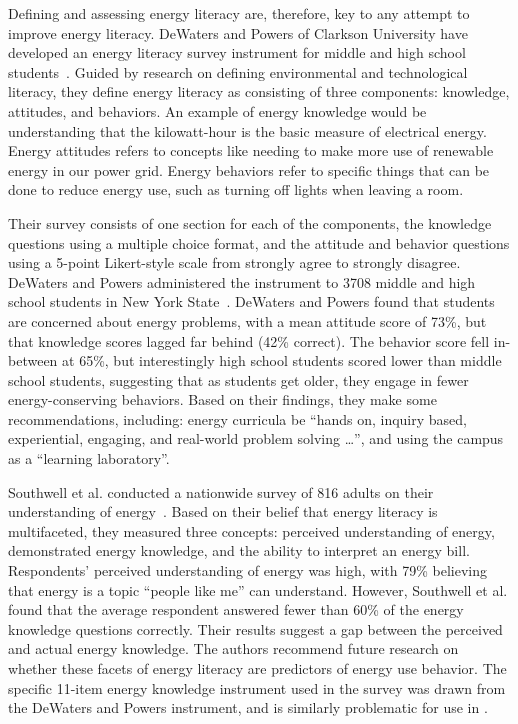 Defining and assessing energy literacy are, therefore, key to any attempt to improve energy literacy. DeWaters and Powers of Clarkson University have developed an energy literacy survey instrument for middle and high school students~\cite{DeWaters2007,DeWaters2008}. Guided by research on defining environmental and technological literacy, they define energy literacy as consisting of three components: knowledge, attitudes, and behaviors. An example of energy knowledge would be understanding that the kilowatt-hour is the basic measure of electrical energy. Energy attitudes refers to concepts like needing to make more use of renewable energy in our power grid. Energy behaviors refer to specific things that can be done to reduce energy use, such as turning off lights when leaving a room.

Their survey consists of one section for each of the components, the knowledge questions using a multiple choice format, and the attitude and behavior questions using a 5-point Likert-style scale from strongly agree to strongly disagree. DeWaters and Powers administered the instrument to 3708 middle and high school students in New York State~\cite{DeWaters2011}. DeWaters and Powers found that students are concerned about energy problems, with a mean attitude score of 73\%, but that knowledge scores lagged far behind (42\% correct). The behavior score fell in-between at 65\%, but interestingly high school students scored lower than middle school students, suggesting that as students get older, they engage in fewer energy-conserving behaviors. Based on their findings, they make some recommendations, including: energy curricula be ``hands on, inquiry based, experiential, engaging, and real-world problem solving \ldots'', and using the campus as a ``learning laboratory''.

Southwell et al. conducted a nationwide survey of 816 adults on their understanding of energy~\cite{Southwell2012}. Based on their belief that energy literacy is multifaceted, they measured three concepts: perceived understanding of energy, demonstrated energy knowledge, and the ability to interpret an energy bill. Respondents' perceived understanding of energy was high, with 79\% believing that energy is a topic ``people like me'' can understand. However, Southwell et al. found that the average respondent answered fewer than 60\% of the energy knowledge questions correctly. Their results suggest a gap between the perceived and actual energy knowledge. The authors recommend future research on whether these facets of energy literacy are predictors of energy use behavior. The specific 11-item energy knowledge instrument used in the survey was drawn from the DeWaters and Powers instrument, and is similarly problematic for use in \Hawaii.

